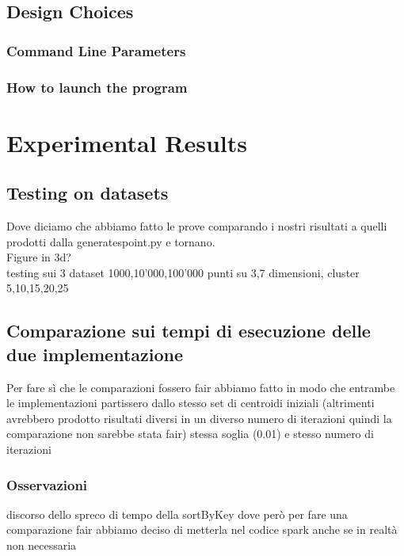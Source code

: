 \documentclass[11pt,a4paper]{article}
\begin{document}
\subsection{Design Choices}
\subsubsection{Command Line Parameters}
\subsubsection{How to launch the program}
\section{Experimental Results} \label{sez:results}
\subsection{Testing on datasets}
Dove diciamo che abbiamo fatto le prove comparando i nostri risultati a quelli prodotti dalla generatespoint.py e tornano.\\
Figure in 3d?\\
testing sui 3 dataset 1000,10'000,100'000 punti su 3,7 dimensioni, cluster 5,10,15,20,25
\subsection{Comparazione sui tempi di esecuzione delle due implementazione}
Per fare sì che le comparazioni fossero fair abbiamo fatto in modo che entrambe le implementazioni partissero dallo stesso set di centroidi iniziali (altrimenti avrebbero prodotto risultati diversi in un diverso numero di iterazioni quindi la comparazione non sarebbe stata fair)
stessa soglia (0.01) e stesso numero di iterazioni
\subsubsection{Osservazioni}
discorso dello spreco di tempo della sortByKey dove però per fare una comparazione fair abbiamo deciso di metterla nel codice spark anche se in realtà non necessaria
\end{document}
